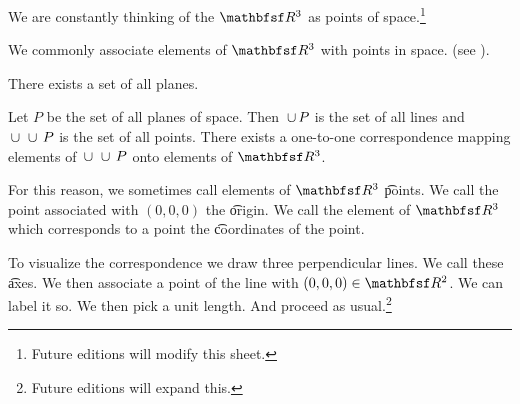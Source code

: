 
%


We are constantly thinking of the $\R^3$ as points of space.\footnote{Future editions will modify this sheet.}


We commonly associate elements of $\R^3$ with points in space. (see ).

\begin{principle}
  There exists a set of all planes.
\end{principle}

\begin{principle}
  Let $P$ be the set of all planes of space.
  Then $\,\cup\, P$ is the set of all lines and $\,\cup\, \,\cup\, P$ is the set of all points.
  There exists a one-to-one correspondence mapping elements of $\,\cup\, \,\cup\, P$ onto elements of $\R^3$.
\end{principle}
For this reason, we sometimes call elements of $\R^3$ \t{points}.
We call the point associated with $(0, 0, 0)$ the \t{origin}.
We call the element of $\R^3$ which corresponds to a point the \t{coordinates} of the point.


To visualize the correspondence we draw three perpendicular lines.
We call these \t{axes}.
We then associate a point of the line with $(0, 0, 0) \in \R^2$.
We can label it so.
We then pick a unit length.
And proceed as usual.\footnote{Future editions will expand this.}

\blankpage

